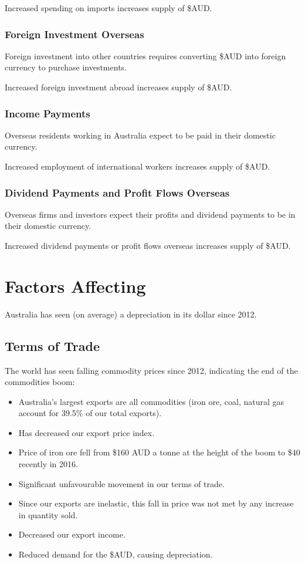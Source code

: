\documentclass[a4paper,11pt]{article}
\begin{document}
Increased spending on imports increases supply of \$AUD.


\subsubsection{Foreign Investment Overseas}

Foreign investment into other countries requires converting \$AUD into foreign
currency to purchase investments.

Increased foreign investment abroad increases supply of \$AUD.


\subsubsection{Income Payments}

Overseas residents working in Australia expect to be paid in their domestic
currency.

Increased employment of international workers increases supply of \$AUD.


\subsubsection{Dividend Payments and Profit Flows Overseas}

Overseas firms and investors expect their profits and dividend payments to be
in their domestic currency.

Increased dividend payments or profit flows overseas increases supply of \$AUD.




\section{Factors Affecting}

Australia has seen (on average) a depreciation in its dollar since 2012.


\subsection{Terms of Trade}

The world has seen falling commodity prices since 2012, indicating the end of
the commodities boom:

\begin{itemize}
\item Australia's largest exports are all commodities (iron ore, coal, natural
	gas account for 39.5\% of our total exports).
\item Has decreased our export price index.
\item Price of iron ore fell from \$160 AUD a tonne at the height of the boom
	to \$40 recently in 2016.
\item Significant unfavourable movement in our terms of trade.
\item Since our exports are inelastic, this fall in price was not met by any
	increase in quantity sold.
\item Decreased our export income.
\item Reduced demand for the \$AUD, causing depreciation.
\end{itemize}
\end{document}
